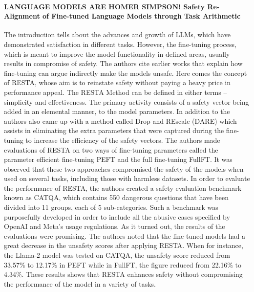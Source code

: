 \documentclass[conference]{IEEEtran}
\begin{document}
\paragraph{LANGUAGE MODELS ARE HOMER SIMPSON! Safety Re-Alignment of Fine-tuned Language Models through Task Arithmetic} The introduction tells about the advances and growth of LLMs\cite{paper-2}, which have demonstrated satisfaction in different tasks. However, the fine-tuning process, which is meant to improve the model functionality in defined areas, usually results in compromise of safety. The authors cite earlier works that explain how fine-tuning can argue indirectly make the models unsafe. Here comes the concept of RESTA, whose aim is to reinstate safety without paying a heavy  price in performance appeal.
The RESTA Method can be defined in either terms – simplicity and effectiveness. The primary activity consists of a safety vector being added in an elemental manner, to the model parameters. In addition to the authors also came up with a method called Drop and REscale (DARE) which assists in eliminating the extra parameters that were captured during the fine-tuning to increase the efficiency of the safety vectors.
The authors made evaluations of RESTA on two ways of fine-tuning parameters called the parameter efficient fine-tuning PEFT and the full fine-tuning FullFT. It was observed that these two approaches compromised the safety of the models when used on several tasks, including those with harmless datasets. In order to evaluate the performance of RESTA, the authors created a safety evaluation benchmark known as CATQA, which contains 550 dangerous questions that have been divided into 11 groups, each of 5 sub-categories. Such a benchmark was purposefully developed in order to include all the abusive cases specified by OpenAI and Meta’s usage regulations.
As it turned out, the results of the evaluations were promising. The authors noted that the fine-tuned models had a great decrease in the unsafety scores after applying RESTA. When for instance, the Llama-2 model was tested on CATQA, the unsafety score reduced from 33.57\% to 12.17\% in PEFT while in FullFT, the figure reduced from 22.16\% to 4.34\%. These results shows that RESTA enhances safety without compromising the performance of the model in a variety of tasks.
\end{document}
